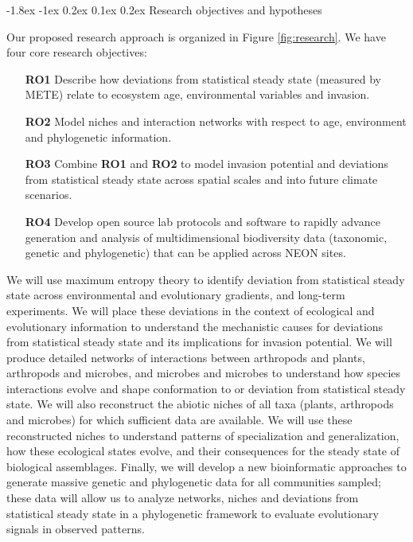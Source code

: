 \documentclass[11pt]{article}
\makeatletter
\renewcommand\subsection{\@startsection{subsection}{1}{\z@}%
                                  {-1.8ex \@plus -1ex \@minus 0.2ex}%
                                  {0.1ex \@plus 0.2ex}%
                                  {\normalfont\large\bfseries}}
\makeatother
\begin{document}
\subsection{Research objectives and hypotheses}

Our proposed research approach is organized in Figure
\ref{fig:research}.  We have four core research objectives:
\begin{itemize}
\item[{\bf RO1}] Describe how deviations from statistical steady state
  (measured by METE) relate to ecosystem age, environmental
  variables and invasion.
\item[{\bf RO2}] Model niches and interaction networks with respect to
  age, environment and phylogenetic information.
\item[{\bf RO3}] Combine {\bf RO1} and {\bf RO2} to model invasion
  potential and deviations from statistical steady state across
  spatial scales and into future climate scenarios.
\item[{\bf RO4}] Develop open source lab protocols and software to rapidly
  advance generation and analysis of multidimensional biodiversity
  data (taxonomic, genetic and phylogenetic) that can be applied
  across NEON sites.
\end{itemize}

We will use maximum entropy theory to identify deviation from
statistical steady state across environmental and evolutionary
gradients, and long-term experiments.  We will place these deviations
in the context of ecological and evolutionary information to
understand the mechanistic causes for deviations from statistical
steady state and its implications for invasion potential.  We will
produce detailed networks of interactions between arthropods and
plants, arthropods and microbes, and microbes and microbes to
understand how species interactions evolve and shape conformation to
or deviation from statistical steady state.  We will also reconstruct
the abiotic niches of all taxa (plants, arthropods and microbes) for
which sufficient data are available.  We will use these reconstructed
niches to understand patterns of specialization and generalization,
how these ecological states evolve, and their consequences for the
steady state of biological assemblages.  Finally, we will develop a
new bioinformatic approaches to generate massive genetic and
phylogenetic data for all communities sampled; these data will allow
us to analyze networks, niches and deviations from statistical steady
state in a phylogenetic framework to evaluate evolutionary signals in
observed patterns.
\end{document}
